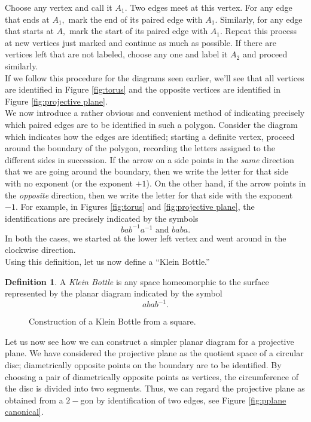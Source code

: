 \documentclass{article}
\theoremstyle{definition}
\newtheorem{defn}[theorem]{Definition}
\begin{document}
Choose any vertex and call it $A_1.$ Two edges meet at this vertex. For any edge that ends at $A_1,$ mark the end of its paired edge with $A_1.$ Similarly, for any edge that starts at $A,$ mark the start of its paired edge with $A_1.$ Repeat this process at new vertices just marked and continue as much as possible. If there are vertices left that are not labeled, choose any one and label it $A_2$ and proceed similarly.\\
If we follow this procedure for the diagrams seen earlier, we'll see that all vertices are identified in Figure \ref{fig:torus} and the opposite vertices are identified in Figure \ref{fig:projective plane}.\\
We now introduce a rather obvious and convenient method of indicating precisely which paired edges are to be identified in such a polygon. Consider the diagram which indicates how the edges are identified; starting a definite vertex, proceed around the boundary of the polygon, recording the letters assigned to the different sides in succession. If the arrow on a side points in the \emph{same} direction that we are going around the boundary, then we write the letter for that side with no exponent (or the exponent $+1$). On the other hand, if the arrow points in the \emph{opposite} direction, then we write the letter for that side with the exponent $-1.$ For example, in Figures \ref{fig:torus} and \ref{fig:projective plane}, the identifications are precisely indicated by the symbols
\[bab^{-1}a^{-1} \text{ and } baba.\]
In both the cases, we started at the lower left vertex and went around in the clockwise direction.\\
Using this definition, let us now define a ``Klein Bottle.''
\begin{defn}
  A \emph{Klein Bottle} is any space homeomorphic to the surface represented by the planar diagram indicated by the symbol
  \[abab^{-1}.\]
  \begin{figure}[htb]
    \centering
    
    \caption{Construction of a Klein Bottle from a square.}
    \label{fig:klein}
  \end{figure}
\end{defn}
Let us now see how we can construct a simpler planar diagram for a projective plane. We have considered the projective plane as the quotient space of a circular disc; diametrically opposite points on the boundary are to be identified. By choosing a pair of diametrically opposite points as vertices, the circumference of the disc is divided into two segments. Thus, we can regard the projective plane as obtained from a $2-$gon by identification of two edges, see Figure \ref{fig:pplane canonical}.
\end{document}
